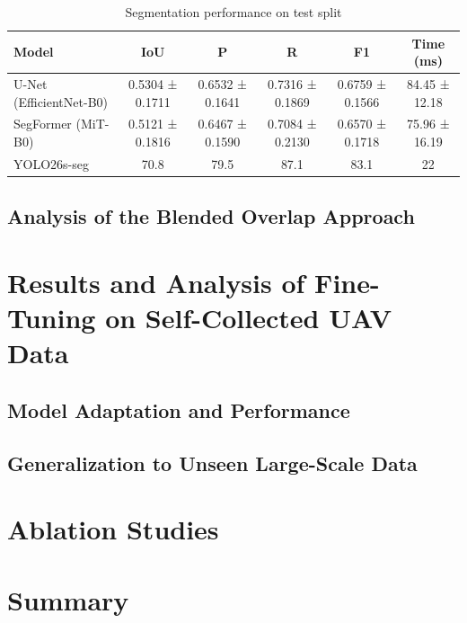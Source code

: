 \begin{table}[htbp]
    \centering
    \caption{Segmentation performance on test split}
    \label{tab:segmentation_performance}
    \begin{tabular}{p{4.5cm}ccccc}
        \toprule
        \textbf{Model}          & \textbf{IoU} & \textbf{P} & \textbf{R} & \textbf{F1} & \textbf{Time (ms)} \\
        \midrule
        U-Net (EfficientNet-B0) & 0.5304 ± 0.1711         & 0.6532 ± 0.1641       & 0.7316 ± 0.1869            & 0.6759 ± 0.1566        & 84.45 ± 12.18                 \\
        SegFormer (MiT-B0)      & 0.5121 ± 0.1816         & 0.6467 ± 0.1590       & 0.7084 ± 0.2130           & 0.6570 ± 0.1718        & 75.96 ± 16.19                 \\
        YOLO26s-seg             & 70.8         & 79.5       & 87.1            & 83.1        & 22                 \\
        \bottomrule
    \end{tabular}
\end{table}
\newpage

\subsection{Analysis of the Blended Overlap Approach}

\section{Results and Analysis of Fine-Tuning on Self-Collected UAV Data}
\subsection{Model Adaptation and Performance}
\subsection{Generalization to Unseen Large-Scale Data}

\section{Ablation Studies}

\section{Summary}